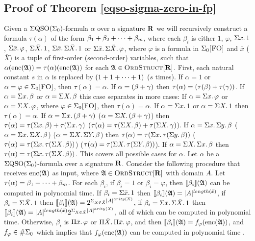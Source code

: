 \subsection{Proof of Theorem \ref{eqso-sigma-zero-in-fp}}

Given a $\Sigma{\rm QSO}(\Sigma_{0})$-formula $\alpha$ over a signature $\mathbf{R}$ we will recursively construct a formula $\tau(\alpha)$ of the form $\beta_1+\beta_2+\cdots+\beta_m$, where each $\beta_i$ is either $1$, $\varphi$, $\Sigma{\bar{x}}.\,1$, $\Sigma{\bar{x}}.\,\varphi$, $\Sigma{\bar{X}}.\,1$, $\Sigma{\bar{x}}.\,\Sigma{\bar{X}}.\,1$ or $\Sigma{\bar{x}}.\,\Sigma{\bar{X}}.\,\varphi$, where $\varphi$ is a formula in $\Sigma_{0}\textsc{[FO]}$ and $\bar{x}$ ($\bar{X}$) is a tuple of first-order (second-order) variables, such that $\alpha({\rm enc}(\mathfrak{A})) = \tau(\alpha)({\rm enc}(\mathfrak{A}))$ for each $\mathfrak{A}\in\text{\sc OrdStruct}[\mathbf{R}]$. First, each natural constant $s$ in $\alpha$ is replaced by $(1+ 1+\cdots+ 1)$ ($s$ times). If $\alpha = 1$ or $\alpha = \varphi \in \Sigma_{0}\textsc{[FO]}$, then $\tau(\alpha) = \alpha$. If $\alpha = (\beta + \gamma)$ then $\tau(\alpha) = (\tau(\beta) + \tau(\gamma))$. If $\alpha = \Sigma{x}.\,\beta$ or $\alpha = \Sigma{X}.\,\beta$ this case separates in more cases: If $\alpha = \Sigma{x}.\,\varphi$ or $\alpha = \Sigma{X}.\,\varphi$, where $\varphi \in \Sigma_{0}\textsc{[FO]}$, then $\tau(\alpha) = \alpha$. If $\alpha = \Sigma{x}.\, 1$ or $\alpha = \Sigma{X}.\, 1$ then $\tau(\alpha) = \alpha$. If $\alpha = \Sigma{x}.\,(\beta+\gamma)$ ($\alpha = \Sigma{X}.\,(\beta+\gamma)$) then $\tau(\alpha) = \tau(\Sigma{x}.\,\beta) + \tau(\Sigma{x}.\,\gamma)$ ($\tau(\alpha) = \tau(\Sigma{X}.\,\beta) + \tau(\Sigma{X}.\,\gamma)$). If $\alpha = \Sigma{x}.\,\Sigma{y}.\,\beta$ ($\alpha = \Sigma{x}.\,\Sigma{X}.\,\beta$) ($\alpha = \Sigma{X}.\,\Sigma{Y}.\,\beta$) then $\tau(\alpha) = \tau(\Sigma{x}.\,\tau(\Sigma{y}.\,\beta))$ ($\tau(\alpha) = \tau(\Sigma{x}.\,\tau(\Sigma{X}.\,\beta))$) ($\tau(\alpha) = \tau(\Sigma{X}.\,\tau(\Sigma{Y}.\,\beta))$). If $\alpha = \Sigma{X}.\,\Sigma{x}.\,\beta$ then $\tau(\alpha) = \tau(\Sigma{x}.\,\tau(\Sigma{X}.\,\beta))$. This covers all possible cases for $\alpha$. Let $\alpha$ be a $\Sigma{\rm QSO}(\Sigma_{0})$-formula over a signature $\mathbf{R}$. Consider the following procedure that receives ${\rm enc}(\mathfrak{A})$ as input, where $\mathfrak{A}\in\text{\sc OrdStruct}[\mathbf{R}]$ with domain $A$. Let $\tau(\alpha) = \beta_1+\cdots+\beta_m$. For each $\beta_i$, if $\beta_i = 1$ or $\beta_i = \varphi$, then ${\llbracket{}{\beta_i}\rrbracket}(\mathfrak{A})$ can be computed in polynomial time. If $\beta_i = \Sigma{\bar{x}}.\,1$ then ${\llbracket{}{\beta_i}\rrbracket}(\mathfrak{A}) = \vert A \vert^{length(\bar{x})}$, if $\beta_i = \Sigma{\bar{X}}.\,1$ then ${\llbracket{}{\beta_i}\rrbracket}(\mathfrak{A}) = 2^{\Sigma_{X\in\bar{X}}\vert A \vert^{arity(X)}}$, if $\beta_i = \Sigma{\bar{x}}.\,\Sigma{\bar{X}}.\,1$ then ${\llbracket{}{\beta_i}\rrbracket}(\mathfrak{A}) = \vert A \vert^{length(\bar{x})}2^{\Sigma_{X\in\bar{X}}\vert A \vert^{arity(X)}}$, all of which can be computed in polynomial time. Otherwise, $\beta_i$ is $\Pi{\bar{x}}.\,\varphi$ or $\Pi{\bar{X}}.\,\Pi{\bar{x}}.\,\varphi$, and then ${\llbracket{}{\beta_i}\rrbracket}(\mathfrak{A}) = f_{\varphi}({\rm enc}(\mathfrak{A}))$, and $f_{\varphi}\in \#\Sigma_{0}$ which implies that $f_{\varphi}({\rm enc}(\mathfrak{A}))$ can be computed in polynomial time \cite{DBLP:journals/jcss/SalujaST95}. 

